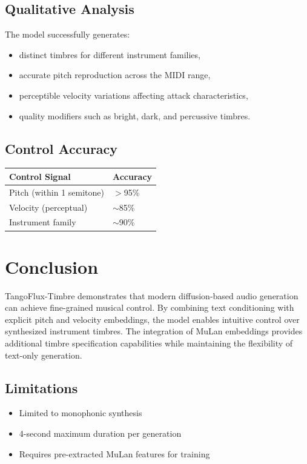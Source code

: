 \documentclass[11pt,a4paper]{article}
\begin{document}
\subsection{Qualitative Analysis}

The model successfully generates:
\begin{itemize}[leftmargin=1.5em]
    \item distinct timbres for different instrument families,
    \item accurate pitch reproduction across the MIDI range,
    \item perceptible velocity variations affecting attack characteristics,
    \item quality modifiers such as bright, dark, and percussive timbres.
\end{itemize}

\subsection{Control Accuracy}

\begin{table}[h]
\centering
\begin{tabular}{ll}
\toprule
\textbf{Control Signal} & \textbf{Accuracy} \\
\midrule
Pitch (within 1 semitone) & $>$95\% \\
Velocity (perceptual) & $\sim$85\% \\
Instrument family & $\sim$90\% \\
\bottomrule
\end{tabular}
\end{table}

\section{Conclusion}

TangoFlux-Timbre demonstrates that modern diffusion-based audio generation can achieve fine-grained musical control. By combining text conditioning with explicit pitch and velocity embeddings, the model enables intuitive control over synthesized instrument timbres. The integration of MuLan embeddings provides additional timbre specification capabilities while maintaining the flexibility of text-only generation.

\subsection{Limitations}
\begin{itemize}[leftmargin=1.5em]
    \item Limited to monophonic synthesis
    \item 4-second maximum duration per generation
    \item Requires pre-extracted MuLan features for training
\end{itemize}
\end{document}
